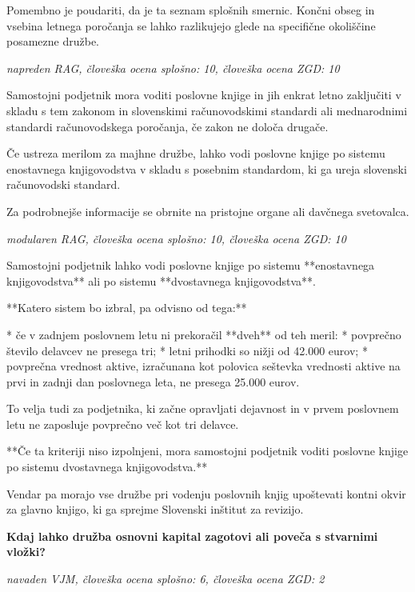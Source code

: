 \documentclass[a4paper,12pt,openright]{book}
\begin{document}
Pomembno je poudariti, da je ta seznam splošnih smernic. Končni obseg in vsebina letnega poročanja se lahko razlikujejo glede na specifične okoliščine posamezne družbe.

\vspace{0.5cm}
\textit{napreden RAG, človeška ocena splošno: 10, človeška ocena ZGD: 10}

Samostojni podjetnik mora voditi poslovne knjige in jih enkrat letno zaključiti v skladu s tem zakonom in slovenskimi računovodskimi standardi ali mednarodnimi standardi računovodskega poročanja, če zakon ne določa drugače.

Če ustreza merilom za majhne družbe, lahko vodi poslovne knjige po sistemu enostavnega knjigovodstva v skladu s posebnim standardom, ki ga ureja slovenski računovodski standard.


Za podrobnejše informacije se obrnite na pristojne organe ali davčnega svetovalca.

\vspace{0.5cm}
\textit{modularen RAG, človeška ocena splošno: 10, človeška ocena ZGD: 10}

Samostojni podjetnik lahko vodi poslovne knjige po sistemu **enostavnega knjigovodstva** ali po sistemu **dvostavnega knjigovodstva**.

**Katero sistem bo izbral, pa odvisno od tega:**

*  če v zadnjem poslovnem letu ni prekoračil **dveh** od teh meril:
    * povprečno število delavcev ne presega tri;
    * letni prihodki so nižji od 42.000 eurov;
    * povprečna vrednost aktive, izračunana kot polovica seštevka vrednosti aktive na prvi in zadnji dan poslovnega leta, ne presega 25.000 eurov.

To velja tudi za podjetnika, ki začne opravljati dejavnost in v prvem poslovnem letu ne zaposluje povprečno več kot tri delavce.

**Če ta kriteriji niso izpolnjeni, mora samostojni podjetnik voditi poslovne knjige po sistemu dvostavnega knjigovodstva.**



Vendar pa morajo vse družbe pri vodenju poslovnih knjig upoštevati kontni okvir za glavno knjigo, ki ga sprejme Slovenski inštitut za revizijo.

\vspace{0.5cm}
\textbf{Kdaj lahko družba osnovni kapital zagotovi ali poveča s stvarnimi vložki?}

\textit{navaden VJM, človeška ocena splošno: 6, človeška ocena ZGD: 2}
\end{document}
